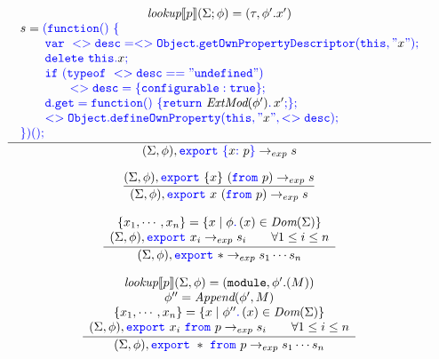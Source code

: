 \documentclass[a4paper]{article}
\newcommand{\code}[1]{\textcolor{blue}{\tt #1}}
\newcommand{\mydot}{.\,}
\newcommand{\module}{{\tt{module}}}
\newcommand{\lookup}{\emph{lookup}}
\begin{document}
\begin{equation*}
\frac{
    \begin{array}{c}
    \lookup \llbracket p \rrbracket (\Sigma; \phi) = (\tau, \phi'.x') \\
    \begin{array}{l}
    s = \code{(function()}\ \code{\{} \\
    \qquad \code{var\ <>desc = <>Object.getOwnPropertyDescriptor(this, "}x\code{");} \\
    \qquad \code{delete\ this.}x\code{;} \\
    \qquad \code{if\ (typeof\ <>desc == "undefined")} \\
    \qquad\qquad \code{<>desc = \{ configurable: true \};} \\
    \qquad \code{d.get = function()\ \{} \code{return}\ \emph{ExtMod} (\phi') \code{\mydot} x' \code{;} \code{\};} \\
    \qquad \code{<>Object.defineOwnProperty(this, "}x\code{", <>desc);} \\
    \code{\})} \code{();} \\
    \end{array}
    \end{array}
}{
    (\Sigma, \phi), \code{export}\ \code{\{} x \code{:}\ p \code{\}} \rightarrow_{exp} s
}
\end{equation*}

\begin{equation*}
\frac{
    (\Sigma, \phi), \code{export}\ \{ x \}\ (\code{from}\ p) \rightarrow_{exp} s
}{
    (\Sigma, \phi), \code{export}\ x\ (\code{from}\ p) \rightarrow_{exp} s
}
\end{equation*}

\begin{equation*}
\frac{
    \begin{array}{c}
    \{ x_1, \cdots, x_n \} = \{ x \mid \phi\code{\mydot}(x) \in \emph{Dom} (\Sigma) \} \\
    (\Sigma, \phi), \code{export}\ x_i \rightarrow_{exp} s_i \qquad \forall 1 \le i \le n \\
    \end{array}
}{
    (\Sigma, \phi), \code{export}\ * \rightarrow_{exp} s_1 \cdots s_n
}
\end{equation*}

\begin{equation*}
\frac{
    \begin{array}{c}
    \emph{lookup} \llbracket p \rrbracket (\Sigma, \phi) = (\module, \phi'.(M)) \\
    \phi'' = \emph{Append} (\phi', M) \\
    \{ x_1, \cdots, x_n \} = \{ x \mid \phi'' \code{\mydot} (x) \in \emph{Dom} (\Sigma) \} \\
    (\Sigma, \phi), \code{export}\ x_i\ \code{from}\ p \rightarrow_{exp} s_i \qquad \forall 1 \le i \le n \\
    \end{array}
}{
    (\Sigma, \phi), \code{export}\ *\ \code{from}\ p \rightarrow_{exp} s_1 \cdots s_n
}
\end{equation*}
\end{document}
